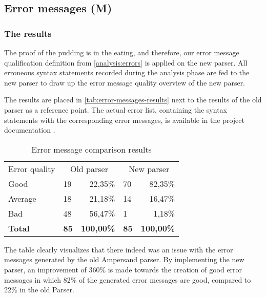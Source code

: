 
\subsection{Error messages  (M)}
\label{design:errors}

\subsubsection{The results}
The proof of the pudding is in the eating, and therefore, our error message qualification definition from \autoref{analysis:errors} is applied on the new parser.
All erroneous syntax statements recorded during the analysis phase are fed to the new parser to draw up the error message quality overview of the new parser.

The results are placed in \autoref{tab:error-messages-results} next to the results of the old parser as a reference point.
The actual error list, containing the syntax statements with the corresponding error messages, is available in the project documentation .

\begin{table}[h]
  \centering
	\begin{tabular}{llrlr}
    Error quality  & \multicolumn{2}{c}{Old parser} & \multicolumn{2}{c}{New parser} \\
		Good           & 19          & 22,35\%          & 70          & 82,35\%          \\
		Average        & 18          & 21,18\%          & 14          & 16,47\%          \\
		Bad            & 48          & 56,47\%          & 1           &  1,18\%          \\
		\rowcolor[HTML]{BBBBBB}
		\textbf{Total} & \textbf{85} & \textbf{100,00\%} & \textbf{85} & \textbf{100,00\%}
	\end{tabular}
  \caption{Error message comparison results}
  \label{tab:error-messages-results}
\end{table}

The table clearly visualizes that there indeed was an issue with the error messages generated by the old Ampersand parser.
By implementing the new parser, an improvement of 360\% is made towards the creation of good error messages in which 82\% of the generated error messages are good, compared to 22\% in the old Parser.


